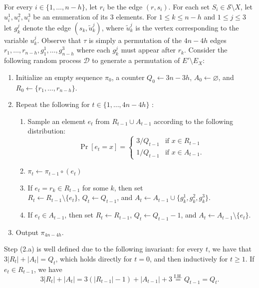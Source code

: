 \documentclass[11pt]{amsart}
\newcommand{\ns}{s}
\newcommand{\nou}{\tilde{u}}
\begin{document}
For every $i \in \{1, \dots, n-h\}$, let $r_i$ be the edge $(r, \ns_i)$. For each set $S_i \in \mathcal{S} \setminus X$, let $u_i^1, u_i^2, u_i^3$ be an enumeration of its $3$ elements. For $1 \leq k \leq n-h$ and $1 \leq j \leq 3$ let $g_{k}^j$ denote the edge $(\ns_k, \nou_k^j)$, where $\nou_k^j$ is the vertex corresponding to the variable $u_k^j$.
Observe that $\tau$ is simply a permutation of the $4n-4h$ edges $r_1, \dots, r_{n-h}, g_1^1, \dots, g_{n-h}^3$ where each $g_{k}^j$ must appear after $r_k$. Consider the following random process $\mathcal{D}$ to generate a permutation of $E' \setminus E_X$:
    \begin{enumerate}
    
        \item Initialize an empty sequence $\pi_0$, a counter $Q_0 \gets 3n-3h$, $A_0 \gets \varnothing$, and ${R_0 \gets \{r_1, \ldots, r_{n-h}\}}$.
        \item Repeat the following for $t \in \{1, \dots, 4n-4h\}$ : 
        \begin{enumerate}
            \item Sample an element $e_t$ from $R_{t-1} \cup A_{t-1}$ according to the following distribution:
            \[
            \Pr[e_t = x] = \begin{cases}
                3/Q_{t-1} & \text{if } x \in R_{t-1}\\
                1/Q_{t-1} & \text{if } x \in A_{t-1}.
            \end{cases}
            \]
            \item $\pi_t \gets \pi_{t-1} \circ (e_t)$
            \item If $e_t = r_k \in R_{t-1}$ for some $k$, then set\\ $R_t \gets R_{t-1} \setminus \{e_{t}\}$, $Q_t \gets Q_{t-1}$, and $A_t \gets A_{t-1} \cup \{ g_k^1, g_k^2, g_k^3\}$. %
            \item If $e_t \in A_{t-1}$, then set $R_t \gets R_{t-1}$,  $Q_{t} \gets Q_{t-1} - 1$, and $A_t \gets A_{t-1} \setminus \{e_t\}$.
        \end{enumerate}
        \item Output $\pi_{4n-4h}$.
    \end{enumerate}
    Step (2.a) is well defined due to the following invariant: for every $t$, we have that $3|R_t| + |A_t| = Q_t$, which holds directly for $t = 0$, and then inductively for $t \geq 1$. If $e_t \in R_{t-1}$, we have 
    \[
    3|R_t| + |A_t| = 3(|R_{t-1}|- 1) + |A_{t-1}| + 3 \overset{\mathrm{I.H.}}{=} Q_{t-1} = Q_t.
    \]
\end{document}
